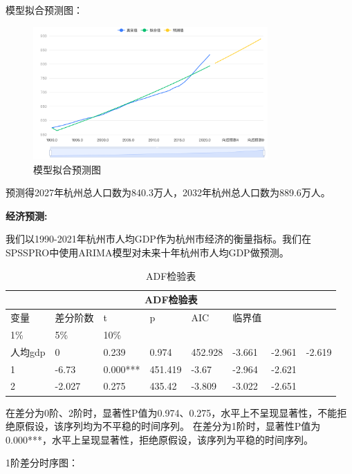 \documentclass[12pt, a4paper, oneside]{ctexart}
\begin{document}
模型拟合预测图：
\begin{figure}[H]
  \centering
  \includegraphics[width=0.8\textwidth]{pic/模型拟合预测图.png}
  \caption{模型拟合预测图}
  \label{fig:模型拟合预测图}
\end{figure}



预测得2027年杭州总人口数为840.3万人，2032年杭州总人口数为889.6万人。

\textbf{经济预测:}

我们以1990-2021年杭州市人均GDP作为杭州市经济的衡量指标。我们在SPSSPRO中使用ARIMA模型对未来十年杭州市人均GDP做预测。

\begin{table}[H]
  \centering
  \begin{tabularx}{0.9\textwidth}{llXXXXXX}
  \toprule
  \multicolumn{8}{c}{ADF检验表}\\
  \midrule
  变量 & 差分阶数 & t & p & AIC & 临界值 & & \\
  1\% & 5\% & 10\% & & & & & \\
  人均gdp & 0 & 0.239 & 0.974 & 452.928 & -3.661 & -2.961 & -2.619 \\
  1 & -6.73 & 0.000*** & 451.419 & -3.67 & -2.964 & -2.621 & \\
  2 & -2.027 & 0.275 & 435.42 & -3.809 & -3.022 & -2.651 & \\
  \bottomrule
  \end{tabularx}
  \caption{ADF检验表}
  \label{tab:ADF}
\end{table}

在差分为0阶、2阶时，显著性P值为0.974、0.275，水平上不呈现显著性，不能拒绝原假设，该序列均为不平稳的时间序列。
在差分为1阶时，显著性P值为0.000***，水平上呈现显著性，拒绝原假设，该序列为平稳的时间序列。

1阶差分时序图：
\end{document}
